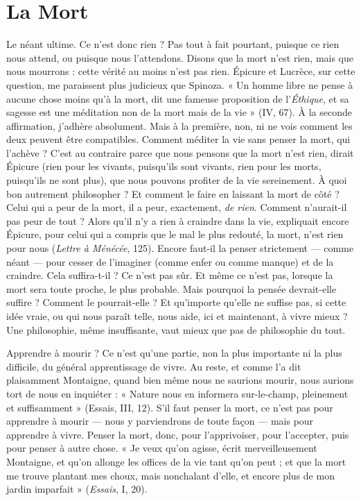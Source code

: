
\section{La Mort}
Le néant ultime. Ce n’est donc rien ? Pas tout à fait pourtant, puisque
ce rien nous attend, ou puisque nous l’attendons. Disons que la
mort n’est rien, mais que nous mourrons : cette vérité au moins n’est pas rien.
Épicure et Lucrèce, sur cette question, me paraissent plus judicieux que Spinoza.
« Un homme libre ne pense à aucune chose moins qu’à la mort, dit une
fameuse proposition de l’{\it Éthique}, et sa sagesse est une méditation non de la mort
mais de la vie » (IV, 67). À la seconde affirmation, j'adhère absolument. Mais à
la première, non, ni ne vois comment les deux peuvent être compatibles. Comment
méditer la vie sans penser la mort, qui l’achève ? C’est au contraire parce
que nous pensons que la mort n’est rien, dirait Épicure (rien pour les vivants,
puisqu'ils sont vivants, rien pour les morts, puisqu'ils ne sont plus), que nous
pouvons profiter de la vie sereinement. À quoi bon autrement philosopher ? Et
comment le faire en laissant la mort de côté ? Celui qui a peur de la mort, il a
peur, exactement, {\it de rien}. Comment n’aurait-il pas peur de tout ? Alors qu’il n’y
a rien à craindre dans la vie, expliquait encore Épicure, pour celui qui a compris
que le mal le plus redouté, la mort, n’est rien pour nous ({\it Lettre à Ménécée}, 125).
Encore faut-il la penser strictement — comme néant — pour cesser de l’imaginer
(comme enfer ou comme manque) et de la craindre. Cela suffira-t-il ? Ce n’est
pas sûr. Et même ce n’est pas, lorsque la mort sera toute proche, le plus probable.
Mais pourquoi la pensée devrait-elle suffire ? Comment le pourrait-elle ? Et
qu'importe qu’elle ne suffise pas, si cette idée vraie, ou qui nous paraît telle, nous
aide, ici et maintenant, à vivre mieux ? Une philosophie, même insuffisante, vaut
mieux que pas de philosophie du tout.

Apprendre à mourir ? Ce n’est qu’une partie, non la plus importante ni la
plus difficile, du général apprentissage de vivre. Au reste, et comme l’a dit plaisamment
Montaigne, quand bien même nous ne saurions mourir, nous aurions
tort de nous en inquiéter : « Nature nous en informera sur-le-champ, pleinement
et suffisamment » (Essais, III, 12). S’il faut penser la mort, ce n’est pas
pour apprendre à mourir — nous y parviendrons de toute façon — mais pour
apprendre à vivre. Penser la mort, donc, pour l’apprivoiser, pour l’accepter,
puis pour penser à autre chose. « Je veux qu’on agisse, écrit merveilleusement
Montaigne, et qu’on allonge les offices de la vie tant qu’on peut ; et que la mort
me trouve plantant mes choux, mais nonchalant d’elle, et encore plus de mon
jardin imparfait » ({\it Essais}, I, 20).

